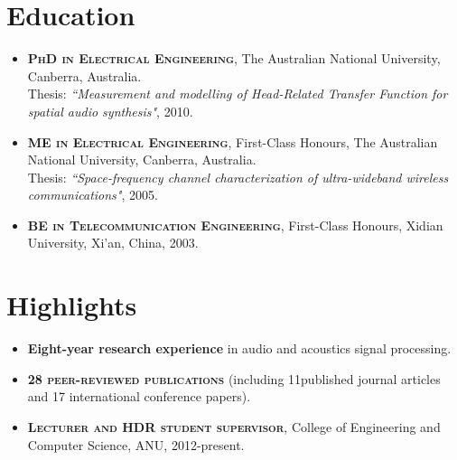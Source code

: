 \documentclass[11pt]{article}
\begin{document}
\begin{itemize}
%
%
%
%

\end{itemize}

\section*{Education}
\begin{itemize}
\item \textsc{\textbf{PhD in Electrical Engineering}}, The Australian National University,
Canberra, Australia.\\
Thesis: \emph{``Measurement and modelling of Head-Related Transfer Function for spatial audio synthesis"},
2010.
\item \textsc{\textbf{ME in Electrical Engineering}}, First-Class Honours, The Australian National University, Canberra, Australia.\\
Thesis: \emph{``Space-frequency channel characterization of ultra-wideband wireless
communications"}, 2005.
\item \textsc{\textbf{BE in Telecommunication Engineering}},
First-Class Honours, Xidian University, Xi'an, China, 2003.
\end{itemize}

\section*{Highlights}
%
\begin{itemize}
%
\item \textbf{Eight-year research experience} in audio and acoustics signal processing.

\item \textsc{\textbf{28 peer-reviewed publications}} (including 11published journal articles and 17 international conference papers).


\item \textsc{\textbf{Lecturer and HDR student supervisor}}, College of Engineering and Computer Science, ANU, 2012-present.
%

\end{itemize}
\end{document}
